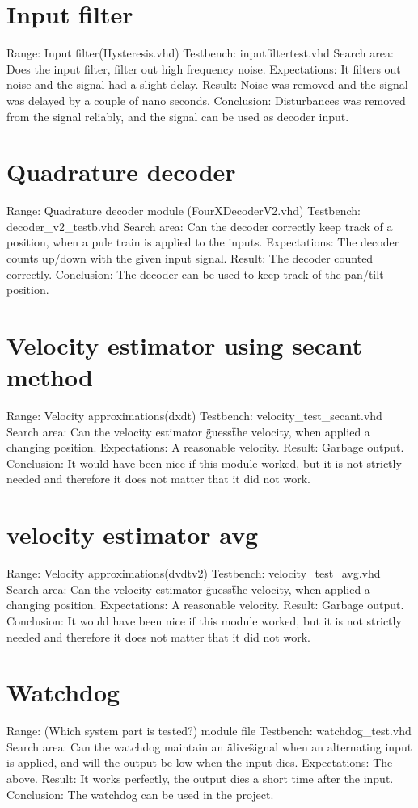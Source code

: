 \section{Input filter}
Range:                  Input filter(Hysteresis.vhd)
Testbench: 				inputfiltertest.vhd
Search area:            Does the input filter, filter out high frequency noise.
Expectations:           It filters out noise and the signal had a slight delay.
Result:                 Noise was removed and the signal was delayed by a couple of nano seconds.
Conclusion:             Disturbances was removed from the signal reliably, and the signal can be used as decoder input.

\section{Quadrature decoder}
Range:                  Quadrature decoder module (FourXDecoderV2.vhd)
Testbench: 				decoder\_v2\_testb.vhd
Search area:            Can the decoder correctly keep track of a position, when a pule train is applied to the inputs.	
Expectations:           The decoder counts up/down with the given input signal.
Result:                 The decoder counted correctly.
Conclusion:             The decoder can be used to keep track of the pan/tilt position.

\section{Velocity estimator using secant method}
Range:                  Velocity approximations(dxdt)
Testbench: 				velocity\_test\_secant.vhd
Search area:            Can the velocity estimator \"guess\" the velocity, when applied a changing position.	
Expectations:           A reasonable velocity.
Result:                 Garbage output.
Conclusion:             It would have been nice if this module worked, but it is not strictly needed and therefore it does not matter that it did not work.

\section{velocity estimator avg}
Range:                  Velocity approximations(dvdtv2)
Testbench: 				velocity\_test\_avg.vhd
Search area:            Can the velocity estimator \"guess\" the velocity, when applied a changing position.
Expectations:           A reasonable velocity.
Result:                 Garbage output.
Conclusion:             It would have been nice if this module worked, but it is not strictly needed and therefore it does not matter that it did not work.

\section{Watchdog}
Range:                  (Which system part is tested?) module file
Testbench: 				watchdog\_test.vhd
Search area:            Can the watchdog maintain an \"alive\" signal when an alternating input is applied, and will the output be low when the input dies.
Expectations:           The above.
Result:                 It works perfectly, the output dies a short time after the input.
Conclusion:             The watchdog can be used in the project.
